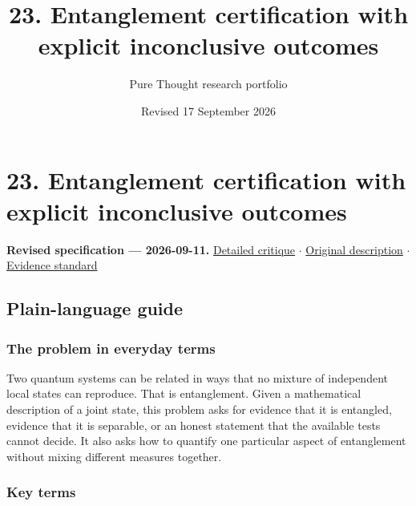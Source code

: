 \documentclass[
  11pt,
]{article}
\title{23. Entanglement certification with explicit inconclusive
outcomes}
\author{Pure Thought research portfolio}
\date{Revised 17 September 2026}
\begin{document}
\maketitle
\thispagestyle{empty}
\clearpage

\section{23. Entanglement certification with explicit inconclusive
outcomes}

\textbf{Revised specification --- 2026-09-11.}
\href{https://github.com/rick-stevens-ai/Pure-Thought/blob/main/reviews/23-Entanglement-Measures-Witnesses.md}{Detailed
critique} \ensuremath{\cdot}
\href{https://github.com/rick-stevens-ai/Pure-Thought/blob/main/archive/original-PRDs/23-Entanglement-Measures-Witnesses.md}{Original
description} \ensuremath{\cdot}
\href{https://github.com/rick-stevens-ai/Pure-Thought/blob/main/reviews/EVIDENCE-STANDARD.md}{Evidence
standard}

\subsection{Plain-language guide}

\subsubsection{The problem in everyday terms}

Two quantum systems can be related in ways that no mixture of
independent local states can reproduce. That is entanglement. Given a
mathematical description of a joint state, this problem asks for
evidence that it is entangled, evidence that it is separable, or an
honest statement that the available tests cannot decide. It also asks
how to quantify one particular aspect of entanglement without mixing
different measures together.

\subsubsection{Key terms}
\end{document}
